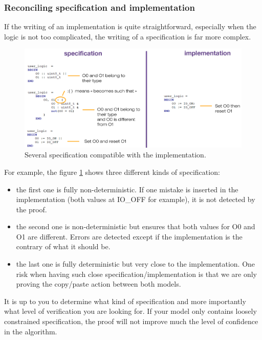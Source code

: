 \subsubsection{Reconciling specification and implementation}

If the writing of an implementation is quite straightforward, especially when the logic is not too complicated, the writing of a specification is far more complex. 
\begin{figure}[ht]
\centering\includegraphics[scale=0.30]{Pictures/chapterProgramming/subst-reconcile.png}
\caption{Several specification compatible with the implementation. }
\label{programming:subst-reconcile}
\end{figure}  
For example, the figure \ref{programming:subst-reconcile} shows three different kinds of specification:
\begin{itemize}
    \item the first one is fully non-deterministic. If one mistake is inserted in the implementation (both values at IO\_OFF for example), it is not detected by the proof.
    \item the second one is non-deterministic but ensures that both values for O0 and O1 are different. Errors are detected except if the implementation is the contrary of what it should be.
    \item the last one is fully deterministic but very close to the implementation. One risk when having such close specification/implementation is that we are only proving the copy/paste action between both models.
\end{itemize}
It is up to you to determine what kind of specification and more importantly what level of verification you are looking for. If your model only contains loosely constrained specification, the proof will not improve much the level of confidence in the algorithm.
